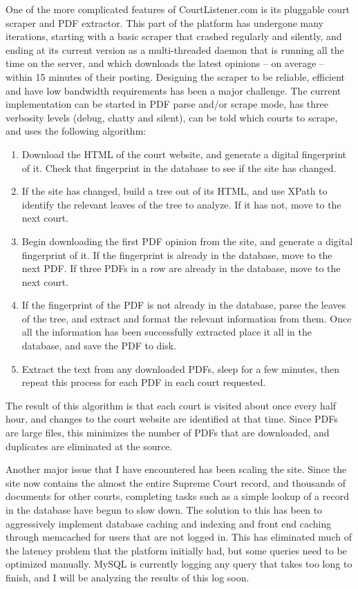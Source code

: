 One of the more complicated features of CourtListener.com is its pluggable court scraper and PDF extractor. This part of the platform has undergone many iterations, starting with a basic scraper that crashed regularly and silently, and ending at its current version as a multi-threaded daemon that is running all the time on the server, and which downloads the latest opinions -- on average -- within 15 minutes of their posting. Designing the scraper to be reliable, efficient and have low bandwidth requirements has been a major challenge. The current implementation can be started in PDF parse and/or scrape mode, has three verbosity levels (debug, chatty and silent), can be told which courts to scrape, and uses the following algorithm:
\begin{enumerate}
    \item{Download the HTML of the court website, and generate a digital fingerprint of it. Check that fingerprint in the database to see if the site has changed.}
    \item{If the site has changed, build a tree out of its HTML, and use XPath to identify the relevant leaves of the tree to analyze. If it has not, move to the next court.}
    \item{Begin downloading the first PDF opinion from the site, and generate a digital fingerprint of it. If the fingerprint is already in the database, move to the next PDF. If three PDFs in a row are already in the database, move to the next court.}
    \item{If the fingerprint of the PDF is not already in the database, parse the leaves of the tree, and extract and format the relevant information from them. Once all the information has been successfully extracted place it all in the database, and save the PDF to disk.}
    \item{Extract the text from any downloaded PDFs, sleep for a few minutes, then repeat this process for each PDF in each court requested.}
\end{enumerate}
The result of this algorithm is that each court is visited about once every half hour, and changes to the court website are identified at that time. Since PDFs are large files, this minimizes the number of PDFs that are downloaded, and duplicates are eliminated at the source.

Another major issue that I have encountered has been scaling the site. Since the site now contains the almost the entire Supreme Court record, and thousands of documents for other courts, completing tasks such as a simple lookup of a record in the database have begun to slow down. The solution to this has been to aggressively implement database caching and indexing and front end caching through memcached for users that are not logged in. This has eliminated much of the latency problem that the platform initially had, but some queries need to be optimized manually. MySQL is currently logging any query that takes too long to finish, and I will be analyzing the results of this log soon.
